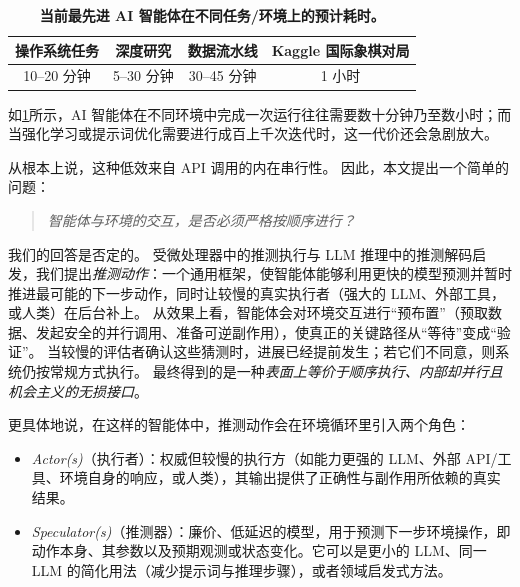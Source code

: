 \documentclass{article} %
\theoremstyle{plain}
\theoremstyle{definition}
\theoremstyle{remark}
\begin{document}
\begin{table}[h]
\centering
\setlength{\tabcolsep}{8pt}
\renewcommand{\arraystretch}{1.3}
\begin{tabular}{*{4}{c}}
\toprule
\makecell{\textbf{操作系统任务}\\ \citep{abhyankar2025osworld}} &
\makecell{\textbf{深度研究}\\ \citep{openai2025deepresearch}} &
\makecell{\textbf{数据流水线}\\ \citep{jin2025elt}} &
\makecell{\textbf{Kaggle 国际象棋对局}\\ \citep{KaggleGameArena}} \\
\midrule
10--20 分钟 & 5--30 分钟 & 30--45 分钟 & 1 小时 \\
\bottomrule
\end{tabular}
\caption{\centering \textbf{当前最先进 AI 智能体在不同任务/环境上的预计耗时。}}
\label{tab:Agent-Wall-Time}
\end{table}

如\cref{tab:Agent-Wall-Time}所示，AI 智能体在不同环境中完成一次运行往往需要数十分钟乃至数小时；而当强化学习或提示词优化需要进行成百上千次迭代时，这一代价还会急剧放大\citep{agrawal2025gepa}。

从根本上说，这种低效来自 API 调用的内在串行性。
因此，本文提出一个简单的问题：
\vspace{-7pt}
\begin{quote}
\emph{智能体与环境的交互，是否必须严格按顺序进行？}
\end{quote}
我们的回答是否定的。
受微处理器中的推测执行与 LLM 推理中的推测解码启发，我们提出\emph{推测动作}：一个通用框架，使智能体能够利用更快的模型预测并暂时推进最可能的下一步动作，同时让较慢的真实执行者（强大的 LLM、外部工具，或人类）在后台补上。
从效果上看，智能体会对环境交互进行“预布置”（预取数据、发起安全的并行调用、准备可逆副作用），使真正的关键路径从“等待”变成“验证”。
当较慢的评估者确认这些猜测时，进展已经提前发生；若它们不同意，则系统仍按常规方式执行。
最终得到的是一种\emph{表面上等价于顺序执行、内部却并行且机会主义的无损接口}。

更具体地说，在这样的智能体中，推测动作会在环境循环里引入两个角色：

\begin{itemize}[leftmargin=*]
    \item \emph{Actor(s)}（执行者）：权威但较慢的执行方（如能力更强的 LLM、外部 API/工具、环境自身的响应，或人类），其输出提供了正确性与副作用所依赖的真实结果。
    \item \emph{Speculator(s)}（推测器）：廉价、低延迟的模型，用于预测下一步环境操作，即动作本身、其参数以及预期观测或状态变化。它可以是更小的 LLM、同一 LLM 的简化用法（减少提示词与推理步骤），或者领域启发式方法。
\end{itemize}
\end{document}
